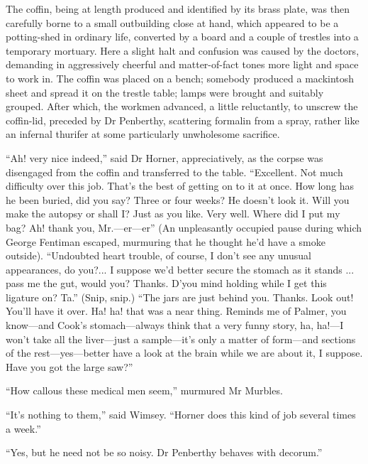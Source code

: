 The coffin, being at length produced and identified by its brass plate, was then carefully borne to a small outbuilding close at hand, which appeared to be a potting-shed in ordinary life, converted by a board and a couple of trestles into a temporary mortuary. Here a slight halt and confusion was caused by the doctors, demanding in aggressively cheerful and matter-of-fact tones more light and space to work in. The coffin was placed on a bench; somebody produced a mackintosh sheet and spread it on the trestle table; lamps were brought and suitably grouped. After which, the workmen advanced, a little reluctantly, to unscrew the coffin-lid, preceded by Dr Penberthy, scattering formalin from a spray, rather like an infernal thurifer at some particularly unwholesome sacrifice.

\enquote{Ah! very nice indeed,} said Dr Horner, appreciatively, as the corpse was disengaged from the coffin and transferred to the table. \enquote{Excellent. Not much difficulty over this job. That's the best of getting on to it at once. How long has he been buried, did you say? Three or four weeks? He doesn't look it. Will you make the autopsy or shall I? Just as you like. Very well. Where did I put my bag? Ah! thank you, Mr.---er\allowbreak---\allowbreak er\longdash} (An unpleasantly occupied pause during which George Fentiman escaped, murmuring that he thought he'd have a smoke outside). \enquote{Undoubted heart trouble, of course, I don't see any unusual appearances, do you?... I suppose we'd better secure the stomach as it stands ... pass me the gut, would you? Thanks. D'you mind holding while I get this ligature on? Ta.} (Snip, snip.) \enquote{The jars are just behind you. Thanks. Look out! You'll have it over. Ha! ha! that was a near thing. Reminds me of Palmer, you know\allowbreak---\allowbreak and Cook's stomach\allowbreak---\allowbreak always think that a very funny story, ha, ha!---I won't take all the liver\allowbreak---\allowbreak just a sample\allowbreak---\allowbreak it's only a matter of form\allowbreak---\allowbreak and sections of the rest\allowbreak---\allowbreak yes---better have a look at the brain while we are about it, I suppose. Have you got the large saw?}

\enquote{How callous these medical men seem,} murmured Mr Murbles.

\enquote{It's nothing to them,} said Wimsey. \enquote{Horner does this kind of job several times a week.}

\enquote{Yes, but he need not be so noisy. Dr Penberthy behaves with decorum.}

